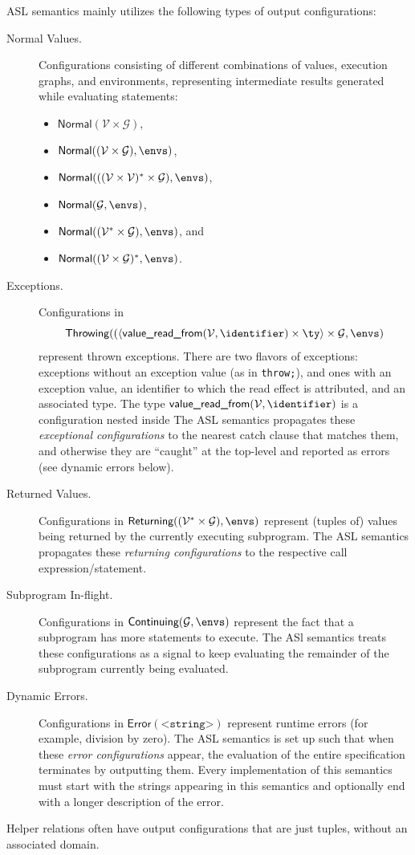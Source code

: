 \documentclass{book}
\newcommand\XGraphs[0]{\mathcal{G}}
\newcommand\vals[0]{\mathcal{V}}
\newcommand\valuereadfrom[0]{\textsf{value\_read\_from}}
\newcommand\Normal[0]{\textsf{Normal}}
\newcommand\Throwing[0]{\textsf{Throwing}}
\newcommand\Continuing[0]{\textsf{Continuing}}
\newcommand\Returning[0]{\textsf{Returning}}
\newcommand\Error[0]{\textsf{Error}}
\begin{document}
ASL semantics mainly utilizes the following types of output configurations:
\begin{description}
  \item[Normal Values.] Configurations consisting of different combinations of values,
  execution graphs, and environments, representing intermediate results
  generated while evaluating statements:
  \begin{itemize}
  \item $\Normal(\vals \times \XGraphs)$,
  \item $\Normal((\vals \times \XGraphs), \envs)$,
  \item $\Normal(((\vals \times \vals)^* \times \XGraphs), \envs)$,
  \item $\Normal(\XGraphs, \envs)$,
  \item $\Normal((\vals^* \times \XGraphs), \envs)$, and
  \item $\Normal((\vals\times\XGraphs)^*, \envs)$.
  \end{itemize}

  \item[Exceptions.] Configurations in
  \[
    \Throwing((\langle \valuereadfrom(\vals,\identifier) \times \ty\rangle \times \XGraphs, \envs)
  \]
  represent thrown exceptions.
  There are two flavors of exceptions:
  exceptions without an exception value (as in \texttt{throw;}), and ones with an exception value,
  an identifier to which the read effect is attributed, and an associated type.
  The type $\valuereadfrom(\vals,\identifier)$ is a configuration nested inside
  The ASL semantics propagates these \emph{exceptional configurations} to the nearest catch clause that matches
  them, and otherwise they are ``caught'' at the top-level and reported as errors (see dynamic errors below).

  \item[Returned Values.] Configurations in $\Returning((\vals^* \times \XGraphs), \envs)$
  represent (tuples of) values being returned by the currently executing subprogram.
  The ASL semantics propagates these \emph{returning configurations} to the respective call expression/statement.

  \item[Subprogram In-flight.] Configurations in $\Continuing(\XGraphs, \envs)$
  represent the fact that a subprogram has more statements to execute.
  The ASl semantics treats these configurations as a signal to keep evaluating the remainder
  of the subprogram currently being evaluated.

  \item[Dynamic Errors.] Configurations in $\Error(\texttt{<string>})$
  represent runtime errors (for example, division by zero).
  The ASL semantics is set up such that when these \emph{error configurations} appear,
  the evaluation of the entire specification terminates by outputting them.
  Every implementation of this semantics must start with the strings appearing in this
  semantics and optionally end with a longer description of the error.
\end{description}
Helper relations often have output configurations that are just tuples, without an associated domain.
\end{document}
